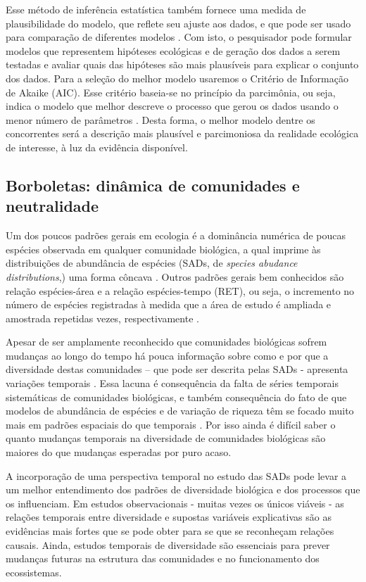 \documentclass[12pt, A4]{article}
\begin{document}
Esse método de inferência estatística também fornece uma medida de
plausibilidade do modelo, que reflete seu ajuste aos dados, e que pode
ser usado para comparação de diferentes modelos 
\citep{Johnson2004}. 
Com isto, o pesquisador pode formular modelos que representem
hipóteses ecológicas e de geração dos dados a serem testadas e avaliar
quais das hipóteses são mais plausíveis para explicar o conjunto
dos dados. Para a seleção do melhor modelo usaremos o Critério de
Informação de Akaike (AIC). Esse critério baseia-se no princípio da
parcimônia, ou seja, indica o modelo que melhor descreve o processo
que gerou os dados
usando o menor número de parâmetros \citep{Burnham2002}. Desta
forma, o melhor modelo dentre os concorrentes será a descrição mais
plausível e parcimoniosa da realidade ecológica de interesse, à luz da
evidência disponível. 

\subsection{Borboletas: dinâmica de comunidades e neutralidade}
\label{sec:dinamica-temporal-borb}

Um dos poucos padrões gerais em ecologia é a dominância numérica de
poucas espécies observada em qualquer comunidade biológica, a qual
imprime às distribuições de abundância de espécies (SADs, de 
\emph{species abudance distributions},) uma forma
côncava \citep{McGill2007,Prado2009}. 
Outros padrões gerais bem conhecidos são relação espécies-área
\citep{lomolino2000ecology} 
e a relação espécies-tempo (RET), ou seja, o incremento no número de
espécies registradas à medida que a área de estudo é ampliada e amostrada
repetidas vezes, respectivamente \citep{Preston1960,white2004,scheiner2011}.

Apesar de ser amplamente reconhecido que comunidades biológicas sofrem
mudanças ao longo do tempo 
há pouca informação sobre como e por que a diversidade destas
comunidades – que pode ser descrita pelas SADs - apresenta variações
temporais \citep{magurran2007}. 
Essa lacuna é
consequência da falta de séries temporais sistemáticas de comunidades
biológicas, e também consequência do fato de que modelos de abundância
de espécies e de variação de riqueza têm se focado muito mais em
padrões espaciais do que temporais
\citep{magurran2007,white2004,magurran2011}. 
Por isso ainda
é difícil saber o quanto mudanças temporais na diversidade de
comunidades biológicas são maiores do que mudanças esperadas por puro
acaso. 

A incorporação de uma perspectiva temporal no estudo das SADs pode
levar a um melhor entendimento dos padrões de diversidade biológica e
dos processos que os influenciam. Em estudos observacionais -
muitas vezes os únicos viáveis - as relações
temporais entre diversidade e supostas variáveis explicativas são as
evidências mais fortes que se pode obter para se que se reconheçam
relações causais. Ainda, estudos temporais de
diversidade são essenciais para prever mudanças futuras na estrutura
das comunidades e no funcionamento dos ecossistemas. 
\end{document}
